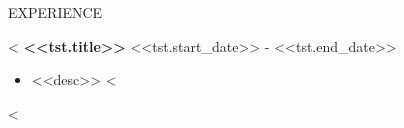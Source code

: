 \documentclass{resume_faangpath_simple_template} %
\begin{document}

\begin{rSection}{EXPERIENCE}

<%
\textbf{<<tst.title>>} \hfill <<tst.start_date>> - <<tst.end_date>>\\
 \begin{itemize}
     <%
     \item <<desc>>
     <%
 \end{itemize}
<%

\end{rSection}
\end{document}
